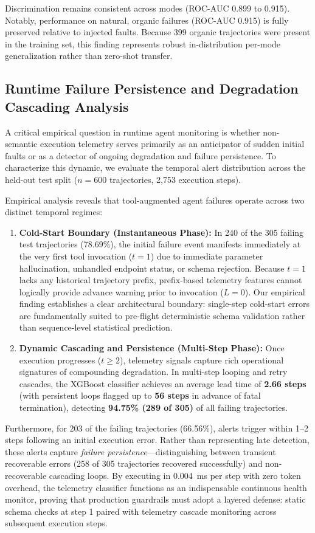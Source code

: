 \documentclass[journal,compsoc]{IEEEtran}
\begin{document}
Discrimination remains consistent across modes (ROC-AUC 0.899 to 0.915). Notably, performance on natural, organic failures (ROC-AUC 0.915) is fully preserved relative to injected faults. Because 399 organic trajectories were present in the training set, this finding represents robust in-distribution per-mode generalization rather than zero-shot transfer.

\subsection{Runtime Failure Persistence and Degradation Cascading Analysis}
A critical empirical question in runtime agent monitoring is whether non-semantic execution telemetry serves primarily as an anticipator of sudden initial faults or as a detector of ongoing degradation and failure persistence. To characterize this dynamic, we evaluate the temporal alert distribution across the held-out test split ($n=600$ trajectories, 2,753 execution steps).

Empirical analysis reveals that tool-augmented agent failures operate across two distinct temporal regimes:
\begin{enumerate}
    \item \textbf{Cold-Start Boundary (Instantaneous Phase):} In 240 of the 305 failing test trajectories (78.69\%), the initial failure event manifests immediately at the very first tool invocation ($t=1$) due to immediate parameter hallucination, unhandled endpoint status, or schema rejection. Because $t=1$ lacks any historical trajectory prefix, prefix-based telemetry features cannot logically provide advance warning prior to invocation ($L=0$). Our empirical finding establishes a clear architectural boundary: single-step cold-start errors are fundamentally suited to pre-flight deterministic schema validation rather than sequence-level statistical prediction.
    \item \textbf{Dynamic Cascading and Persistence (Multi-Step Phase):} Once execution progresses ($t \ge 2$), telemetry signals capture rich operational signatures of compounding degradation. In multi-step looping and retry cascades, the XGBoost classifier achieves an average lead time of \textbf{2.66 steps} (with persistent loops flagged up to \textbf{56 steps} in advance of fatal termination), detecting \textbf{94.75\% (289 of 305)} of all failing trajectories.
\end{enumerate}

Furthermore, for 203 of the failing trajectories (66.56\%), alerts trigger within 1--2 steps following an initial execution error. Rather than representing late detection, these alerts capture \textit{failure persistence}---distinguishing between transient recoverable errors (258 of 305 trajectories recovered successfully) and non-recoverable cascading loops. By executing in 0.004~ms per step with zero token overhead, the telemetry classifier functions as an indispensable continuous health monitor, proving that production guardrails must adopt a layered defense: static schema checks at step 1 paired with telemetry cascade monitoring across subsequent execution steps.
\end{document}
